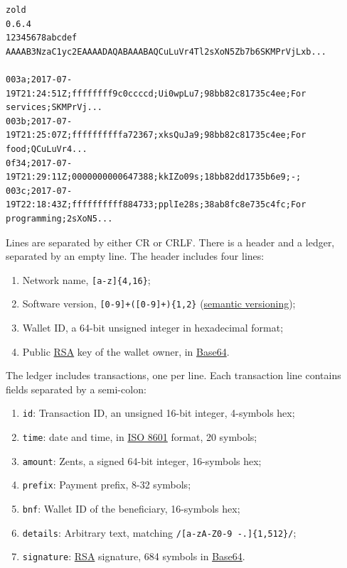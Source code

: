 \documentclass[11pt,oneside]{article}
\newcommand\dd[1]{\colorbox{gray!30}{\texttt{#1}}}
\begin{document}
\begin{verbatim}
zold
0.6.4
12345678abcdef
AAAAB3NzaC1yc2EAAAADAQABAAABAQCuLuVr4Tl2sXoN5Zb7b6SKMPrVjLxb...

003a;2017-07-19T21:24:51Z;ffffffff9c0ccccd;Ui0wpLu7;98bb82c81735c4ee;For services;SKMPrVj...
003b;2017-07-19T21:25:07Z;ffffffffffa72367;xksQuJa9;98bb82c81735c4ee;For food;QCuLuVr4...
0f34;2017-07-19T21:29:11Z;0000000000647388;kkIZo09s;18bb82dd1735b6e9;-;
003c;2017-07-19T22:18:43Z;ffffffffff884733;pplIe28s;38ab8fc8e735c4fc;For programming;2sXoN5...
\end{verbatim}

Lines are separated by either CR or CRLF.
There is a header and a ledger, separated by an empty line.
The header includes four lines:

\begin{enumerate}
  \item Network name, \dd{[a-z]\{4,16\}};
  \item Software version, \dd{[0-9]+(\.[0-9]+)\{1,2\}} (\href{https://semver.org/}{semantic versioning});
  \item Wallet ID, a 64-bit unsigned integer in hexadecimal format;
  \item Public \href{https://en.wikipedia.org/wiki/RSA_(cryptosystem)}{RSA}
    key of the wallet owner, in \href{https://en.wikipedia.org/wiki/Base64}{Base64}.
\end{enumerate}

The ledger includes transactions, one per line. Each transaction line
contains fields separated by a semi-colon:

\begin{enumerate}
  \item \dd{id}: Transaction ID, an unsigned 16-bit integer, 4-symbols hex;
  \item \dd{time}: date and time, in \href{https://en.wikipedia.org/wiki/ISO_8601}{ISO 8601} format, 20 symbols;
  \item \dd{amount}: Zents, a signed 64-bit integer, 16-symbols hex;
  \item \dd{prefix}: Payment prefix, 8-32 symbols;
  \item \dd{bnf}: Wallet ID of the beneficiary, 16-symbols hex;
  \item \dd{details}: Arbitrary text, matching \dd{/[a-zA-Z0-9 -.]\{1,512\}/};
  \item \dd{signature}: \href{https://en.wikipedia.org/wiki/RSA_(cryptosystem)}{RSA} signature,
    684 symbols in \href{https://en.wikipedia.org/wiki/Base64}{Base64}.
\end{enumerate}
\end{document}
